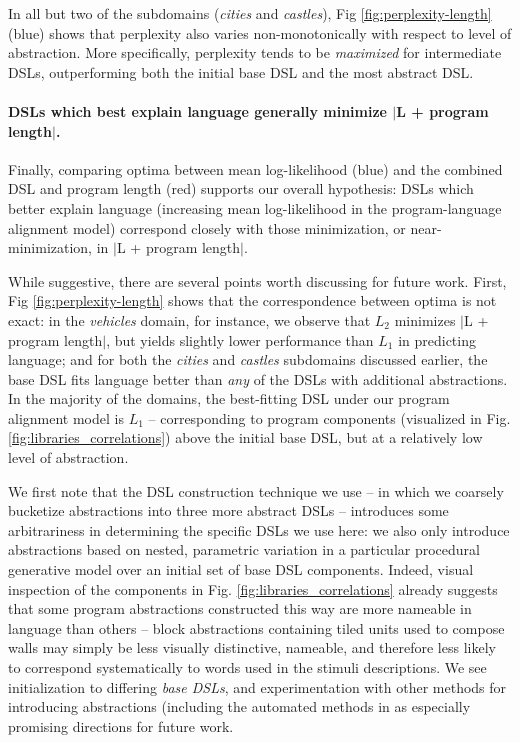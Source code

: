 \documentclass[10pt,letterpaper]{article}
\begin{document}
In all but two of the subdomains (\textit{cities} and \textit{castles}), Fig \ref{fig:perplexity-length} (blue) shows that perplexity also varies non-monotonically with respect to level of abstraction. More specifically, perplexity tends to be \textit{maximized} for intermediate DSLs, outperforming both the initial base DSL and the most abstract DSL.

\paragraph{DSLs which best explain language generally minimize $|$L + program length$|$.} Finally, comparing optima between mean log-likelihood (blue) and the combined DSL and program length (red) supports our overall hypothesis: DSLs which better explain language (increasing mean log-likelihood in the program-language alignment model) correspond closely with those minimization, or near-minimization, in $|$L + program length$|$.

While suggestive, there are several points worth discussing for future work. First, Fig \ref{fig:perplexity-length} shows that the correspondence between optima is not exact: in the \textit{vehicles} domain, for instance, we observe that $L_2$ minimizes $|$L + program length$|$, but yields slightly lower performance than $L_1$ in predicting language; and for both the \textit{cities} and \textit{castles} subdomains discussed earlier, the base DSL fits language better than \textit{any} of the DSLs with additional abstractions. In the majority of the domains, the best-fitting DSL under our program alignment model is $L_1$ -- corresponding to program components (visualized in Fig. \ref{fig:libraries_correlations}) above the initial base DSL, but at a relatively low level of abstraction.

We first note that the DSL construction technique we use -- in which we coarsely bucketize abstractions into three more abstract DSLs -- introduces some arbitrariness in determining the specific DSLs we use here: we also only introduce abstractions based on nested, parametric variation in a particular procedural generative model over an initial set of base DSL components. Indeed, visual inspection of the components in Fig. \ref{fig:libraries_correlations} already suggests that some program abstractions constructed this way are more nameable in language than others -- block abstractions containing tiled units used to compose walls may simply be less visually distinctive, nameable, and therefore less likely to correspond systematically to words used in the stimuli descriptions. We see initialization to differing \textit{base DSLs}, and experimentation with other methods for introducing abstractions (including the automated methods in  as especially promising directions for future work.
\end{document}
